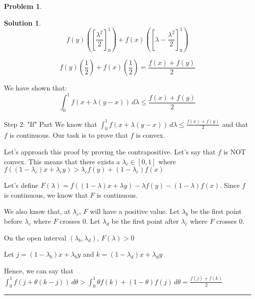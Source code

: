 \documentclass{article}
\theoremstyle{definition}
\newtheorem{problem}{Problem}
\def\fline{\rule{0.75\linewidth}{0.5pt}}
\newcommand{\finishline}{\begin{center}\fline\end{center}}
\newtheorem*{solution*}{Solution}
\newenvironment{solution}{\begin{solution*}}{{\finishline} \end{solution*}}
\begin{document}
\begin{problem}
\begin{solution}
    \begin{equation}
        \label{eq:example}
            f(y) ([\frac{\lambda^2}{2}]^1_0) +  f(x) ([\lambda - \frac{\lambda^2}{2}]^1_0)
    \end{equation}

    \begin{equation}
        \label{eq:example}
            f(y) (\frac{1}{2}) +  f(x) (\frac{1}{2}) = \frac{f(x) + f(y)}{2}
    \end{equation}

We have shown that: 
    \begin{equation}
        \label{eq:example}
            \int_{0}^{1} f(x + \lambda(y - x)) \,d \lambda \leq \frac{f(x) + f(y)}{2}
    \end{equation}

Step 2: "If" Part \newline 
We know that $\int_{0}^{1} f(x + \lambda(y - x)) \,d \lambda \leq \frac{f(x) + f(y)}{2}$ and that $f$ is continuous. Our task is to prove that $f$ is convex. \newline 

Let's approach this proof by proving the contrapositive. Let's say that $f$ is NOT convex. This means that there exists a $\lambda_c \in [0, 1]$ where  $f((1 - \lambda_c)x + \lambda_c y) > \lambda_c f(y) + (1 - \lambda_c) f(x)$ \newline 

Let's define $F(\lambda) = f((1 - \lambda)x + \lambda y) - \lambda f(y) - (1 - \lambda) f(x)$. Since $f$ is continuous, we know that $F$ is continuous. 

We also know that, at $\lambda_c$, $F$ will have a positive value. Let $\lambda_b$ be the first point before $\lambda_c$ where $F$ crosses 0. Let $\lambda_d$ be the first point after $\lambda_c$ where $F$ crosses 0. \newline 

On the open interval $(\lambda_b, \lambda_d)$, $F(\lambda) > 0$ \newline 

Let $j = (1 - \lambda_b)x + \lambda_b y$ and $k = (1 - \lambda_d)x + \lambda_d y$ \newline 

Hence, we can say that $\int_{0}^{1} f(j + \theta(k - j)) \,d \theta > \int_{0}^{1} \theta f(k) + (1 - \theta) f(j) \,d \theta = \frac{f(j) + f(k)}{2}$
    \end{solution}
    
\end{problem}
\end{document}
